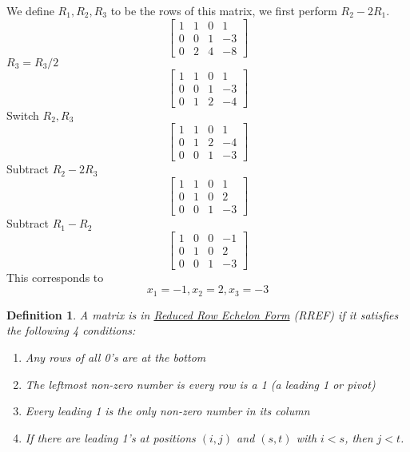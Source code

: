 \documentclass{article}
\newtheorem{definition}[theorem]{Definition}
\newtheorem{one minute paper}[theorem]{One Minute Paper}
\begin{document}
We define $R_1,R_2,R_3$ to be the rows of this matrix, we first perform $R_2 - 2R_1$.
\[\left[
\begin{array}{ccc|c}
    1 & 1 & 0 & 1 \\
    0 & 0 & 1 & -3 \\
    0 & 2 & 4 & -8
\end{array}
\right]\]
$R_3 = R_3/2$
\[\left[
\begin{array}{ccc|c}
    1 & 1 & 0 & 1 \\
    0 & 0 & 1 & -3 \\
    0 & 1 & 2 & -4
\end{array}
\right]\]
Switch $R_2, R_3$
\[\left[
\begin{array}{ccc|c}
    1 & 1 & 0 & 1 \\
    0 & 1 & 2 & -4 \\
    0 & 0 & 1 & -3
\end{array}
\right]\]
Subtract $R_2 - 2R_3$
\[\left[
\begin{array}{ccc|c}
    1 & 1 & 0 & 1 \\
    0 & 1 & 0 & 2 \\
    0 & 0 & 1 & -3
\end{array}
\right]\]
Subtract $R_1 - R_2$
\[\left[
\begin{array}{ccc|c}
    1 & 0 & 0 & -1 \\
    0 & 1 & 0 & 2 \\
    0 & 0 & 1 & -3
\end{array}
\right]\]
This corresponds to
\begin{equation}
    x_1 = -1, x_2 = 2, x_3 = -3
\end{equation}

\begin{definition}
    A matrix is in \underline{Reduced Row Echelon Form} (RREF) if it satisfies the following 4 conditions:
    \begin{enumerate}
        \item Any rows of all 0's are at the bottom
        \item The leftmost non-zero number is every row is a 1 (a leading 1 or pivot)
        \item Every leading 1 is the only non-zero number in its column
        \item If there are leading 1's at positions $(i,j)$ and $(s,t)$ with $i < s$, then $j < t$. 
    \end{enumerate}
\end{definition}
\end{document}
